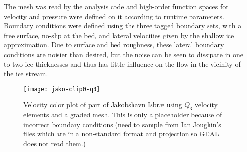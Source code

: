 The mesh was read by the analysis code and high-order function spaces for velocity and pressure were defined on it according to runtime parameters.
Boundary conditions were defined using the three tagged boundary sets, with a free surface, no-slip at the bed, and lateral velocities given by the shallow ice approximation.
Due to surface and bed roughness, these lateral boundary conditions are noisier than desired, but the noise can be seen to dissipate in one to two ice thicknesses and thus has little influence on the flow in the vicinity of the ice stream.


\begin{figure}
  \centering\texttt{[image: jako-clip0-q3]}
  \caption{Velocity color plot of part of Jakobshavn Isbr{\ae} using $Q_3$ velocity elements and a graded mesh. This is only a placeholder because of incorrect boundary conditions (need to sample from Ian Joughin's files which are in a non-standard format and projection so GDAL does not read them.)}\label{fig:jako-clip}
\end{figure}


%
%
%
%

% 
